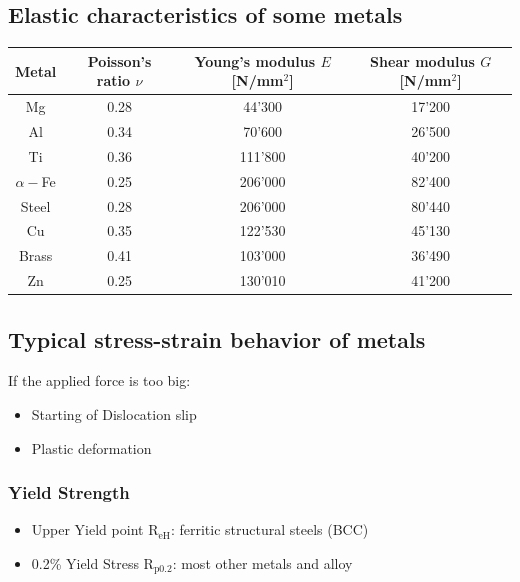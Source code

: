 \documentclass{article}
\begin{document}
\subsection{Elastic characteristics of some metals}
\begin{center}
  \begin{tabular}{|c|c|c|c|}
    \hline
    Metal & Poisson's ratio $\nu$ & Young's modulus $E$ [N/mm$^2$] & Shear modulus $G$ [N/mm$^2$]\\
    \hline
    Mg & 0.28 & 44'300 & 17'200\\
    \hline
    Al & 0.34 & 70'600 & 26'500\\
    \hline
    Ti & 0.36 & 111'800 & 40'200\\
    \hline
    $\alpha-$Fe & 0.25 & 206'000 & 82'400\\
    \hline
    Steel & 0.28 & 206'000 & 80'440\\
    \hline
    Cu & 0.35 & 122'530 & 45'130\\
    \hline
    Brass & 0.41 & 103'000 & 36'490\\
    \hline
    Zn & 0.25 & 130'010 & 41'200\\
    \hline
  \end{tabular}
\end{center}

\newpage
\subsection{Typical stress-strain behavior of metals}
If the applied force is too big:
\begin{itemize}
  \item Starting of Dislocation slip
  \item Plastic deformation
\end{itemize}

\subsubsection{Yield Strength}
\begin{itemize}
  \item Upper Yield point R$_\text{eH}$: ferritic structural steels (BCC)
  \item 0.2\% Yield Stress R$_{\text{p}0.2}$: most other metals and alloy
\end{itemize}
\end{document}
